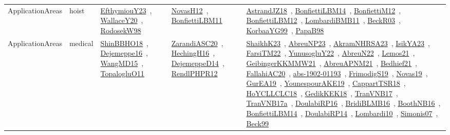 {\begin{longtable}{lp{3cm}>{\raggedright\arraybackslash}p{6cm}>{\raggedright\arraybackslash}p{6cm}>{\raggedright\arraybackslash}p{8cm}}
ApplicationAreas & hoist & \href{works/EfthymiouY23.pdf}{EfthymiouY23}~\cite{EfthymiouY23}, \href{works/WallaceY20.pdf}{WallaceY20}~\cite{WallaceY20}, \href{works/RodosekW98.pdf}{RodosekW98}~\cite{RodosekW98} & \href{works/NovasH12.pdf}{NovasH12}~\cite{NovasH12}, \href{works/BonfiettiLBM11.pdf}{BonfiettiLBM11}~\cite{BonfiettiLBM11} & \href{works/AstrandJZ18.pdf}{AstrandJZ18}~\cite{AstrandJZ18}, \href{works/BonfiettiLBM14.pdf}{BonfiettiLBM14}~\cite{BonfiettiLBM14}, \href{works/BonfiettiM12.pdf}{BonfiettiM12}~\cite{BonfiettiM12}, \href{works/BonfiettiLBM12.pdf}{BonfiettiLBM12}~\cite{BonfiettiLBM12}, \href{works/LombardiBMB11.pdf}{LombardiBMB11}~\cite{LombardiBMB11}, \href{works/BeckR03.pdf}{BeckR03}~\cite{BeckR03}, \href{works/KorbaaYG99.pdf}{KorbaaYG99}~\cite{KorbaaYG99}, \href{works/PapaB98.pdf}{PapaB98}~\cite{PapaB98}\\
ApplicationAreas & medical & \href{works/ShinBBHO18.pdf}{ShinBBHO18}~\cite{ShinBBHO18}, \href{works/Dejemeppe16.pdf}{Dejemeppe16}~\cite{Dejemeppe16}, \href{works/WangMD15.pdf}{WangMD15}~\cite{WangMD15}, \href{works/TopalogluO11.pdf}{TopalogluO11}~\cite{TopalogluO11} & \href{works/ZarandiASC20.pdf}{ZarandiASC20}~\cite{ZarandiASC20}, \href{works/HechingH16.pdf}{HechingH16}~\cite{HechingH16}, \href{works/DejemeppeD14.pdf}{DejemeppeD14}~\cite{DejemeppeD14}, \href{works/RendlPHPR12.pdf}{RendlPHPR12}~\cite{RendlPHPR12} & \href{works/ShaikhK23.pdf}{ShaikhK23}~\cite{ShaikhK23}, \href{works/AbreuNP23.pdf}{AbreuNP23}~\cite{AbreuNP23}, \href{works/AkramNHRSA23.pdf}{AkramNHRSA23}~\cite{AkramNHRSA23}, \href{works/IsikYA23.pdf}{IsikYA23}~\cite{IsikYA23}, \href{works/FarsiTM22.pdf}{FarsiTM22}~\cite{FarsiTM22}, \href{works/YunusogluY22.pdf}{YunusogluY22}~\cite{YunusogluY22}, \href{works/AbreuN22.pdf}{AbreuN22}~\cite{AbreuN22}, \href{works/Lemos21.pdf}{Lemos21}~\cite{Lemos21}, \href{works/GeibingerKKMMW21.pdf}{GeibingerKKMMW21}~\cite{GeibingerKKMMW21}, \href{works/AbreuAPNM21.pdf}{AbreuAPNM21}~\cite{AbreuAPNM21}, \href{works/Bedhief21.pdf}{Bedhief21}~\cite{Bedhief21}, \href{works/FallahiAC20.pdf}{FallahiAC20}~\cite{FallahiAC20}, \href{works/abs-1902-01193.pdf}{abs-1902-01193}~\cite{abs-1902-01193}, \href{works/FrimodigS19.pdf}{FrimodigS19}~\cite{FrimodigS19}, \href{works/Novas19.pdf}{Novas19}~\cite{Novas19}, \href{works/GurEA19.pdf}{GurEA19}~\cite{GurEA19}, \href{works/YounespourAKE19.pdf}{YounespourAKE19}~\cite{YounespourAKE19}, \href{works/CappartTSR18.pdf}{CappartTSR18}~\cite{CappartTSR18}, \href{works/HoYCLLCLC18.pdf}{HoYCLLCLC18}~\cite{HoYCLLCLC18}, \href{works/GedikKEK18.pdf}{GedikKEK18}~\cite{GedikKEK18}, \href{works/TranVNB17.pdf}{TranVNB17}~\cite{TranVNB17}, \href{works/TranVNB17a.pdf}{TranVNB17a}~\cite{TranVNB17a}, \href{works/DoulabiRP16.pdf}{DoulabiRP16}~\cite{DoulabiRP16}, \href{works/BridiBLMB16.pdf}{BridiBLMB16}~\cite{BridiBLMB16}, \href{works/BoothNB16.pdf}{BoothNB16}~\cite{BoothNB16}, \href{works/BonfiettiLBM14.pdf}{BonfiettiLBM14}~\cite{BonfiettiLBM14}, \href{works/DoulabiRP14.pdf}{DoulabiRP14}~\cite{DoulabiRP14}, \href{works/Lombardi10.pdf}{Lombardi10}~\cite{Lombardi10}, \href{works/Simonis07.pdf}{Simonis07}~\cite{Simonis07}, \href{works/Beck99.pdf}{Beck99}~\cite{Beck99}\\

\end{longtable}}
